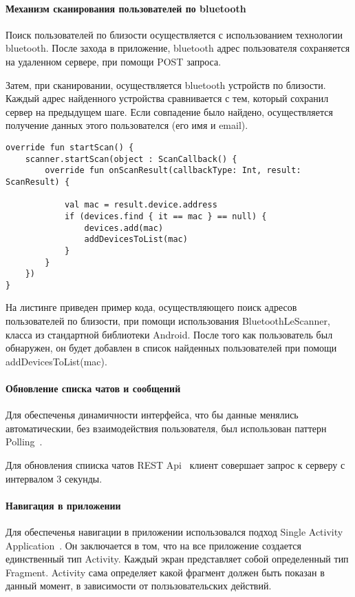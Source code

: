 \documentclass[explnote]{espd}
\begin{document}
\paragraph{Механизм сканирования пользователей по bluetooth}
Поиск пользователей по близости осуществляется с использованием технологии bluetooth. После захода в приложение, bluetooth адрес пользователя сохраняется на удаленном сервере, при помощи POST запроса.

Затем, при сканировании, осуществляется bluetooth устройств по близости. Каждый адрес найденного устройства сравнивается с тем, который сохранил сервер на предыдущем шаге. Если совпадение было найдено, осуществляется получение данных этого пользователся (его имя и email).

\begin{verbatim}
override fun startScan() {
    scanner.startScan(object : ScanCallback() {
        override fun onScanResult(callbackType: Int, result: ScanResult) {

            val mac = result.device.address
            if (devices.find { it == mac } == null) {
                devices.add(mac)
                addDevicesToList(mac)
            }
        }
    })
}
\end{verbatim}

На листинге приведен пример кода, осуществляющего поиск адресов пользователей по близости, при помощи использования BluetoothLeScanner, класса из стандартной библиотеки Android. После того как пользователь был обнаружен, он будет добавлен в список найденных пользователей при помощи addDevicesToList(mac).

\paragraph{Обновление списка чатов и сообщений}
Для обеспеченья динамичности интерфейса, что бы данные менялись автоматическии, без взаимодействия пользователя, был использован паттерн Polling~\cite{polling}.

Для обновления спииска чатов REST Api~\cite{rest} клиент совершает запрос к серверу с интервалом 3 секунды.

\paragraph{Навигация в приложении}
Для обеспеченья навигации в приложении использовался подход Single Activity Application~\cite{SAA}. Он заключается в том, что на все приложение создается единственный тип Activity. Каждый экран представляет собой определенный тип Fragment. Activity сама определяет какой фрагмент должен быть показан в данный момент, в зависимости от ползьзовательских действий. 
\end{document}
